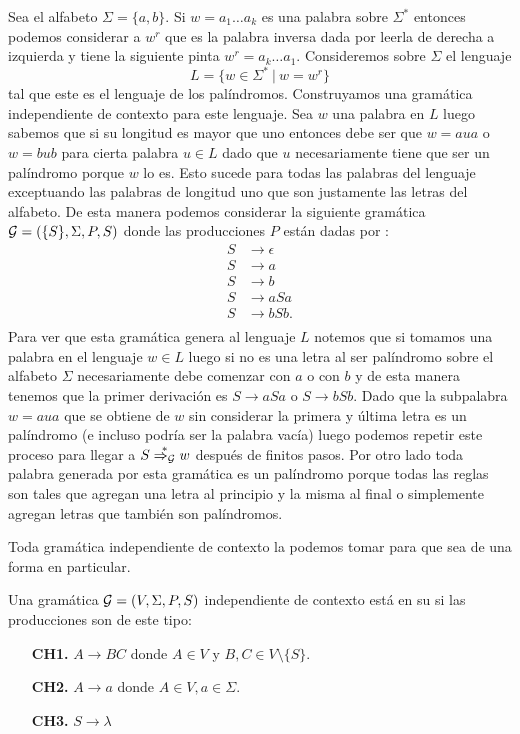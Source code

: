 \documentclass[tesis.tex]{subfiles}
\begin{document}
\begin{ej}\label{leng_ej_gram_palindromos}
	Sea el alfabeto $\Sigma = \{ a,b \}$. Si $w=a_1 \dots a_k$ es una palabra sobre $\Sigma^*$ entonces podemos considerar a $w^r$ que es la palabra inversa dada por leerla de derecha a izquierda y tiene la siguiente pinta $w^r= a_k \dots a_1$. 
	Consideremos sobre $\Sigma$ el lenguaje 
	\[
	L = \{ w \in \Sigma^* \ | \ w = w^r  \}
	\]
	 tal que este es el lenguaje de los palíndromos. 
	Construyamos una gramática independiente de contexto para este lenguaje.
	Sea $w$ una palabra en $L$ luego sabemos que si su longitud es mayor que uno entonces debe ser que $w = a u a$ o $w = b u b$ para cierta palabra $u \in L$ dado que $u$ necesariamente tiene que ser un palíndromo porque $w$ lo es. 
	Esto sucede para todas las palabras del lenguaje exceptuando las palabras de longitud uno que son justamente las letras del alfabeto. 
	De esta manera podemos considerar la siguiente gramática ${\cal G}  =  (\{S\}, \Sigma, P, S )$ donde las producciones $P$ están dadas por :
	\begin{align*}
	S  & \to \epsilon \\ S &\to a \\ S &\to b \\ S &\to  aSa \\ S &\to bSb. \\
	\end{align*}
	Para ver que esta gramática genera al lenguaje $L$ notemos que si tomamos una palabra en el lenguaje $w \in L$ luego si no es una letra al ser palíndromo sobre el alfabeto $\Sigma$ necesariamente debe comenzar con $a$ o con $b$ y de esta manera tenemos que la primer derivación es $S \to aSa$ o $S \to bSb$. 
	Dado que la subpalabra $w = aua$ que se obtiene de $w$ sin considerar la primera y última letra es un palíndromo (e incluso podría ser la palabra vacía) luego podemos repetir este proceso para llegar a $S \overset{*}{\Rightarrow_{\cal G}} w$ después de finitos pasos. 
	Por otro lado toda palabra generada por esta gramática es un palíndromo porque todas las reglas son tales que agregan una letra al principio y la misma al final o simplemente agregan letras que también son palíndromos.
\end{ej}

Toda gramática independiente de contexto la podemos tomar para que sea de una forma en particular.

\begin{deff}
	Una gramática ${\cal G} = (V, \Sigma, P, S)$ independiente de contexto está en su  si las producciones son de este tipo:
	\begin{enumerate}
		\item[\textbf{CH1.}] $A \to BC$ donde $A\in V$ y $B,C \in V \setminus \{ S \}$.
		\item[\textbf{CH2.}] $A \to a$ donde $A \in V, a \in \Sigma$.
		\item[\textbf{CH3.}] $S \to \lambda$ 
	\end{enumerate}
\end{deff}
\end{document}
